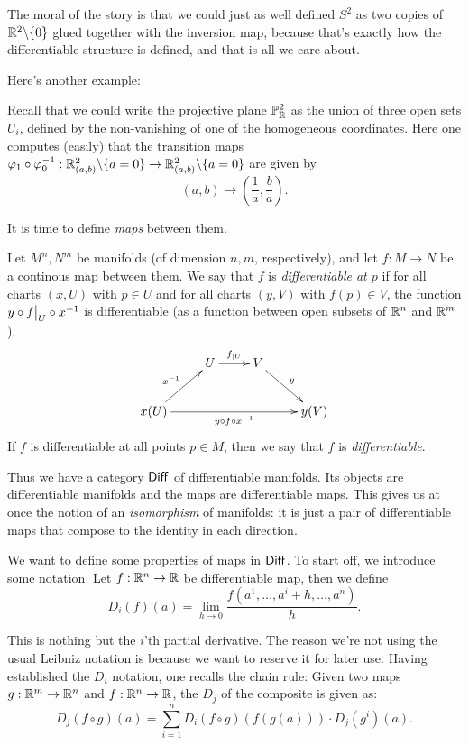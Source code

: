 \documentclass[11pt, english]{article}
\begin{document}
The moral of the story is that we could just as well defined $S^2$ as two copies of $\mathbb{R}^2 \backslash \{ 0\}$ glued together with the inversion map, because that's exactly how the differentiable structure is defined, and that is all we care about.

Here's another example:

\begin{example}
Recall that we could write the projective plane $\mathbb{P}_{\mathbb{R}}^2$ as the union of three open sets $U_i$, defined by the non-vanishing of one of the homogeneous coordinates. Here one computes (easily) that the transition maps $\varphi_1 \circ \varphi_0^{-1}:\mathbb{R}^2_{(a,b)} \backslash \{ a = 0 \}  \to \mathbb{R}^2_{(a,b)} \backslash \{ a = 0\}$ are given by \[(a,b) \mapsto \left (\frac{1}{a}, \frac{b}{a} \right).\]
\end{example}

It is time to define \emph{maps} between them.

\begin{defi}
Let $M^n,N^m$ be manifolds (of dimension $n,m$, respectively), and let $f:M \to N$ be a continous map between them. We say that $f$ is \emph{differentiable at $p$} if for all charts $(x,U)$ with $p \in U$ and for all charts $(y,V)$ with $f(p) \in V$, the function $y \circ \restr fU \circ x^{-1}$ is differentiable (as a function between open subsets of $\mathbb{R}^n$ and $\mathbb{R}^m$).
\[
\xymatrix{
 & U \ar[r]^{f_{|U}} & V \ar[dr]^y \\
x(U) \ar[ur]^{x^{-1}} \ar[rrr]_{y \circ f \circ x^{-1}}  & && y(V)
}
\]
If $f$ is differentiable at all points $p \in M$, then we say that $f$ is \emph{differentiable}.
\end{defi}

Thus we have a category $\mathsf{Diff}$ of differentiable manifolds. Its objects are  differentiable manifolds and the maps are differentiable maps. This gives us at once the notion of an \emph{isomorphism} of manifolds: it is just a pair of differentiable maps that compose to the identity in each direction.

We want to define some properties of maps in $\mathsf{Diff}$. To start off, we introduce some notation. Let $f:\mathbb{R}^n\to\mathbb{R}$ be differentiable map, then we define
\[
D_i (f)(a) = \lim_{h \to 0} \frac{f(a^1,\dotsc, a^i + h,\dotsc, a^n)}{h}.
\]

This is nothing but the $i$'th partial derivative. The reason we're not using the usual Leibniz notation is because we want to reserve it for later use. Having established the $D_i$ notation, one recalls the chain rule: Given two maps $g:\mathbb{R}^m \to \mathbb{R}^n$ and $f:\mathbb{R}^n \to \mathbb{R}$, the $D_j$ of the composite is given as:
\[
D_j(f \circ g)(a) = \sum_{i=1}^n  D_i\left(f \circ g\right)(f(g(a))) \cdot D_j(g^i)(a).
\]
\end{document}
